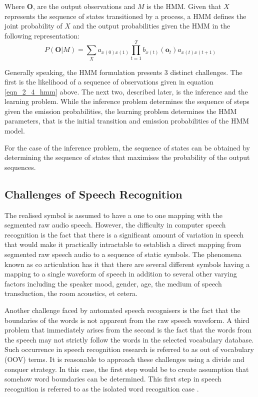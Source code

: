 Where $\mathbf{O}$, are the output observations and $M$ is the HMM.  Given that $X$ represents the sequence of states transitioned by a process, a HMM defines the joint probability of $X$ and the output probabilities given the HMM in the following representation:
\begin{equation}P(\mathbf{O}|M)=\sum_Xa_{x(0)x(1)}\prod_{t=1}^Tb_{x(t)}(\mathbf{o}_t)a_{x(t)x(t+1)}
\label{eqn_2_4_hmm}
\end{equation}

Generally speaking, the HMM formulation presents 3 distinct challenges.  The first is the likelihood of a sequence of observations given in equation \ref{eqn_2_4_hmm} above.  The next two,  described later, is the inference and the learning problem.  While the inference problem determines the sequence of steps given the emission probabilities, the learning problem determines the HMM parameters, that is the initial transition and emission probabilities of the HMM model.

For the case of the inference problem, the sequence of states can be obtained by determining the sequence of states that maximises the probability of the output sequences.

\subsection{Challenges of Speech Recognition}
The realised symbol is assumed to have a one to one mapping with the segmented raw audio speech. However, the difficulty in computer speech recognition is the fact that there is a significant amount of variation in speech that would make it practically intractable to establish a direct mapping from segmented raw speech audio to a sequence of static symbols. The phenomena known as co articulation has it that there are several different symbols having a mapping to a single waveform of speech in addition to several other varying factors including the speaker mood, gender, age, the medium of speech transduction, the room acoustics, et cetera.

Another challenge faced by automated speech recognisers is the fact that the boundaries of the words is not apparent from the raw speech waveform. A third problem that immediately arises from the second is the fact that the words from the speech may not strictly follow the words in the selected vocabulary database.  Such occurrence in speech recognition research is referred to as out of vocabulary (OOV) terms.  It is reasonable to approach these challenges using a divide and conquer strategy.  In this case, the first step would be to create assumption that somehow word boundaries can be determined.  This first step in speech recognition is referred to as the isolated word recognition case \citep{young2002htk}.

